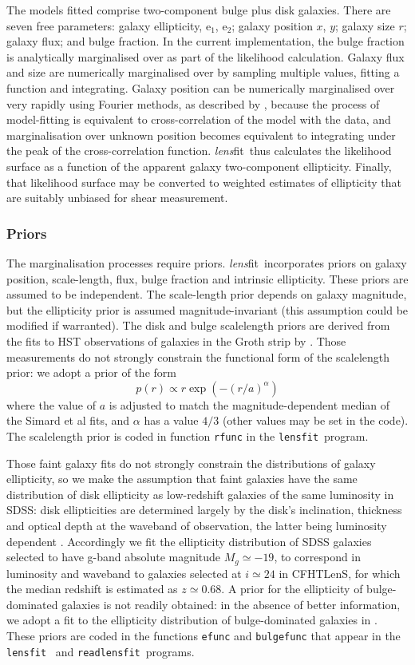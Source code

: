 \documentclass{article}
\def\lensfit{{\tt lensfit}\ }
\def\lensfitsuite{{\em lens}fit\ }
\def\readlensfit{{\tt readlensfit}\ }
\begin{document}
The models fitted comprise two-component bulge plus disk galaxies.  There are seven free parameters:
galaxy ellipticity, e$_1$, e$_2$; galaxy position $x$, $y$; galaxy size $r$; galaxy flux; and bulge fraction.
In the current implementation, the bulge fraction is analytically marginalised over as part of the
likelihood calculation.  Galaxy flux and size are numerically marginalised over by sampling multiple
values, fitting a function and integrating.  Galaxy position can be numerically marginalised over 
very rapidly using Fourier methods, as described by \citet{miller07a}, because the process of model-fitting
is equivalent to cross-correlation of the model with the data, and marginalisation over unknown position
becomes equivalent to integrating under the peak of the cross-correlation function.  \lensfitsuite thus
calculates the likelihood surface as a function of the apparent galaxy two-component ellipticity.  Finally,
that likelihood surface may be converted to weighted estimates of ellipticity that are suitably unbiased
for shear measurement.

\subsubsection{Priors}
The marginalisation processes require priors.  \lensfitsuite incorporates priors on galaxy position, 
scale-length, flux, bulge fraction and intrinsic ellipticity.  These priors are assumed to be independent.
The scale-length prior depends on galaxy magnitude, 
but the ellipticity prior is assumed magnitude-invariant (this assumption could be modified if warranted).
The disk and bulge scalelength priors are derived from the fits to HST observations of galaxies in
the Groth strip by \citet{simard02a}.  Those measurements do not strongly constrain the functional
form of the scalelength prior: we adopt a prior of the form 
\[
p(r) \propto r \exp(-(r/a)^\alpha)
\]
where the value of $a$ is adjusted to match the magnitude-dependent median of the Simard et al fits,
and $\alpha$ has a value $4/3$ (other values may be set in the code). The scalelength prior is
coded in function {\tt rfunc} in the \lensfit program.

Those faint galaxy fits do not strongly constrain the distributions of galaxy ellipticity, so
we make the assumption that faint galaxies have the same distribution of disk ellipticity
as low-redshift galaxies of the same luminosity in SDSS: disk ellipticities are determined largely by
the disk's inclination, thickness and optical depth at the waveband of observation, the latter being
luminosity dependent \citep{unterborn08a}.  Accordingly we fit the ellipticity distribution
of SDSS galaxies selected to have g-band absolute magnitude $M_g \simeq -19$, to correspond in luminosity
and waveband to
galaxies selected at $i \simeq 24$ in CFHTLenS, for which the median redshift is estimated as $z \simeq 0.68$.
A prior for the ellipticity of bulge-dominated galaxies is not readily obtained: in the absence of
better information, we
adopt a fit to the ellipticity distribution of bulge-dominated galaxies in \citet{simard02a}.
These priors are coded in the functions {\tt efunc} and {\tt bulgefunc} that appear in the \lensfit
and \readlensfit programs.
\end{document}

